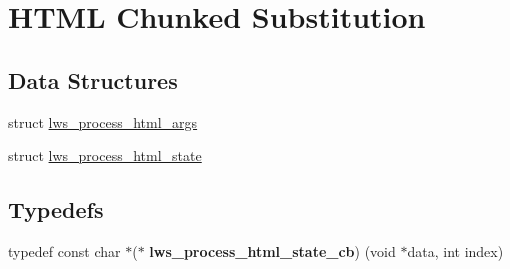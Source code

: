 \hypertarget{group__html-chunked-substitution}{}\section{H\+T\+ML Chunked Substitution}
\label{group__html-chunked-substitution}
\subsection*{Data Structures}
\begin{DoxyCompactItemize}
\item 
struct \hyperlink{structlws__process__html__args}{lws\+\_\+process\+\_\+html\+\_\+args}
\item 
struct \hyperlink{structlws__process__html__state}{lws\+\_\+process\+\_\+html\+\_\+state}
\end{DoxyCompactItemize}
\subsection*{Typedefs}
\begin{DoxyCompactItemize}
\item 
typedef const char $\ast$($\ast$ {\bfseries lws\+\_\+process\+\_\+html\+\_\+state\+\_\+cb}) (void $\ast$data, int index)\hypertarget{group__html-chunked-substitution_ga669d3d7ce2d5f193473f649a89b3e7ac}{}\label{group__html-chunked-substitution_ga669d3d7ce2d5f193473f649a89b3e7ac}

\end{DoxyCompactItemize}

